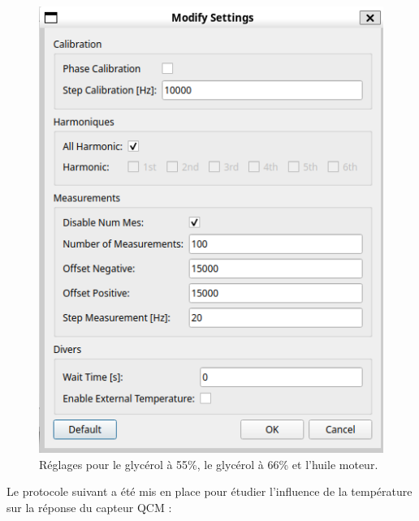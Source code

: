 \begin{figure}[H]
\begin{minipage}{0.48\textwidth}
        \includegraphics[width=\textwidth]{assets/figures/OilSettings.png}
        \caption{Réglages pour le glycérol à 55\%, le glycérol à 66\% et l'huile moteur.}
    \end{minipage}
\end{figure}

Le protocole suivant a été mis en place pour étudier l'influence de la température sur la réponse du capteur QCM :

